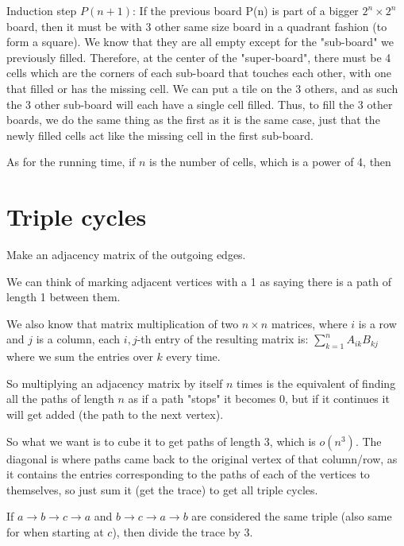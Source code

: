 \documentclass[11pt,letterpaper]{article}
\begin{document}
		Induction step $P(n+1)$: If the previous board P(n) is part of a bigger $2^n \times 2^n$ board, then it must be with 3 other same size board in a quadrant fashion (to form a square). We know that they are all empty except for the "sub-board" we previously filled. Therefore, at the center of the "super-board", there must be 4 cells which are the corners of each sub-board that touches each other, with one that filled or has the missing cell. We can put a tile on the 3 others, and as such the 3 other sub-board will each have a single cell filled. Thus, to fill the 3 other boards, we do the same thing as the first as it is the same case, just that the newly filled cells act like the missing cell in the first sub-board.
		
		As for the running time, if $n$ is the number of cells, which is a power of 4, then
	
	\section{Triple cycles}
		Make an adjacency matrix of the outgoing edges.
		
		We can think of marking adjacent vertices with a 1 as saying there is a path of length 1 between them.
		
		We also know that matrix multiplication of two $n \times n$ matrices, where $i$ is a row and $j$ is a column, each $i,j$-th entry of the resulting matrix is:
		$\sum_{k=1}^{n}A_{ik}B_{kj}$
		where we sum the entries over $k$ every time.
		
		So multiplying an adjacency matrix by itself $n$ times is the equivalent of finding all the paths of length $n$ as if a path "stops" it becomes 0, but if it continues it will get added (the path to the next vertex).
		
		So what we want is to cube it to get paths of length 3, which is $o(n^3)$.
		The diagonal is where paths came back to the original vertex of that column/row, as it contains the entries corresponding to the paths of each of the vertices to themselves, so just sum it (get the trace) to get all triple cycles.
		
		If $a \rightarrow b \rightarrow c \rightarrow a$ and $b \rightarrow c \rightarrow a \rightarrow b$ are considered the same triple (also same for when starting at $c$), then divide the trace by 3.
	
\end{document}
